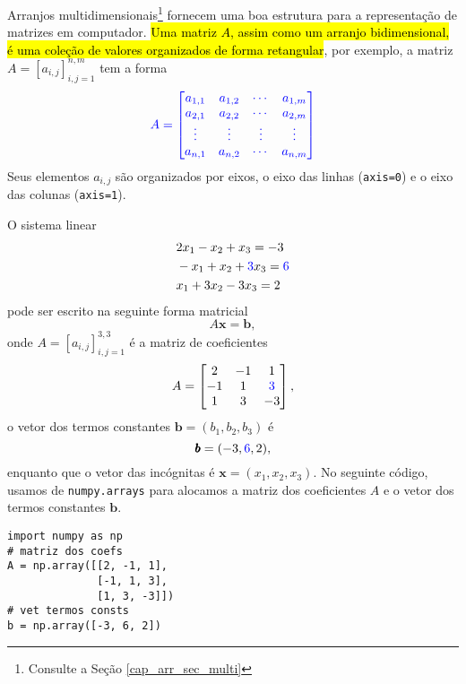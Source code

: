 Arranjos multidimensionais\footnote{Consulte a Seção \ref{cap_arr_sec_multi}} fornecem uma boa estrutura para a representação de matrizes em computador. \hl{Uma matriz $A$, assim como um arranjo bidimensional, é uma coleção de valores organizados de forma retangular}, por exemplo, a matriz $A = [a_{i,j}]_{i,j=1}^{n,m}$ tem a forma
\begin{equation}\color{blue}A =
  \begin{bmatrix}
    a_{1,1} & a_{1,2} & \cdots & a_{1,m}\\
    a_{2,1} & a_{2,2} & \cdots & a_{2,m}\\
    \vdots & \vdots & \vdots & \vdots\\
    a_{n,1} & a_{n,2} & \cdots & a_{n,m}
  \end{bmatrix}
\end{equation}
Seus elementos $a_{i,j}$ são organizados por eixos, o eixo das linhas (\lstinline+axis=0+) e o eixo das colunas (\lstinline+axis=1+).

\begin{ex}\label{cap_arr_sec_mat:ex:sislin}
  O sistema linear
  \begin{subequations}
    \begin{align}
      &2x_1 - x_2 + x_3 = -3\\
      &-x_1 + x_2 + {\color{blue}3}x_3 = {\color{blue}6}\\
      &x_1 + 3x_2 - 3x_3 = 2
    \end{align}
  \end{subequations}
  pode ser escrito na seguinte forma matricial
  \begin{equation}
    A\pmb{x} = \pmb{b},
  \end{equation}
  onde $A = [a_{i,j}]_{i,j=1}^{3,3}$ é a matriz de coeficientes
  \begin{equation}
    A =
    \begin{bmatrix}
      2 & -1 & 1\\
      -1 & 1 & {\color{blue}3}\\
      1 & 3 & -3
    \end{bmatrix},
  \end{equation}
  o vetor dos termos constantes $\pmb{b} = (b_1, b_2, b_3)$ é
  \begin{equation}
    \pmb{b} = (-3, {\color{blue}6}, 2),
  \end{equation}
  enquanto que o vetor das incógnitas é $\pmb{x} = (x_1, x_2, x_3)$. No seguinte código, usamos de \lstinline+numpy.arrays+ para alocamos a matriz dos coeficientes $A$ e o vetor dos termos constantes $\pmb{b}$.
\begin{lstlisting}
import numpy as np
# matriz dos coefs
A = np.array([[2, -1, 1],
              [-1, 1, 3],
              [1, 3, -3]])
# vet termos consts
b = np.array([-3, 6, 2])
\end{lstlisting}
\end{ex}

